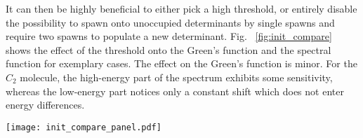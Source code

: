 It can then be highly beneficial to either pick a high threshold, or entirely
disable the possibility to spawn onto unoccupied determinants by single spawns 
and require two spawns to populate a new determinant. Fig.   
~\ref{fig:init_compare} shows the effect of the threshold onto the Green's
function and the spectral function for exemplary cases. The effect on the
Green's function is minor. For the $C_2$ molecule, the high-energy part of the
spectrum exhibits some sensitivity, whereas the low-energy part notices only a
constant shift which does not enter energy differences. 

\begin{figure*}[t]
\texttt{[image: init\_compare\_panel.pdf]}
\caption{(a) Green's function of the $U/t=2$ 18-site Hubbard model for fixed
  $\alpha=0.2$ for different initiator thresholds and without any initiators ($\infty$),
  allowing only double spawns to populate new determinants, and
  as obtained using Lanczos. (b) Photo absorption spectra of $C_2$ in the
  cc-pVTZ basis set for different thresholds and without initiators.
Large values of $\alpha$ were used for the smaller thresholds, leading
to broader spectra.}
\label{fig:init_compare}
\end{figure*}

